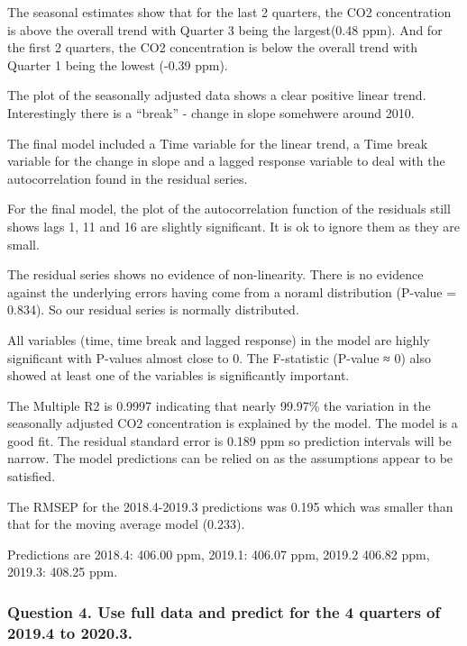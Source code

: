 \documentclass[]{article}
\begin{document}
The seasonal estimates show that for the last 2 quarters, the CO2
concentration is above the overall trend with Quarter 3 being the
largest(0.48 ppm). And for the first 2 quarters, the CO2 concentration
is below the overall trend with Quarter 1 being the lowest (-0.39 ppm).

The plot of the seasonally adjusted data shows a clear positive linear
trend. Interestingly there is a ``break'' - change in slope somehwere
around 2010.

The final model included a Time variable for the linear trend, a Time
break variable for the change in slope and a lagged response variable to
deal with the autocorrelation found in the residual series.

For the final model, the plot of the autocorrelation function of the
residuals still shows lags 1, 11 and 16 are slightly significant. It is
ok to ignore them as they are small.

The residual series shows no evidence of non-linearity. There is no
evidence against the underlying errors having come from a noraml
distribution (P-value = 0.834). So our residual series is normally
distributed.

All variables (time, time break and lagged response) in the model are
highly significant with P-values almost close to 0. The F-statistic
(P-value ≈ 0) also showed at least one of the variables is significantly
important.

The Multiple R2 is 0.9997 indicating that nearly 99.97\% the variation
in the seasonally adjusted CO2 concentration is explained by the model.
The model is a good fit. The residual standard error is 0.189 ppm so
prediction intervals will be narrow. The model predictions can be relied
on as the assumptions appear to be satisfied.

The RMSEP for the 2018.4-2019.3 predictions was 0.195 which was smaller
than that for the moving average model (0.233).

Predictions are 2018.4: 406.00 ppm, 2019.1: 406.07 ppm, 2019.2 406.82
ppm, 2019.3: 408.25 ppm.

\hypertarget{question-4.-use-full-data-and-predict-for-the-4-quarters-of-2019.4-to-2020.3.}{%
\subsubsection{Question 4. Use full data and predict for the 4 quarters
of 2019.4 to
2020.3.}\label{question-4.-use-full-data-and-predict-for-the-4-quarters-of-2019.4-to-2020.3.}}
\end{document}
